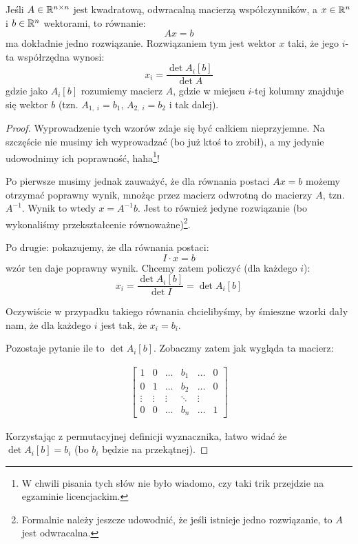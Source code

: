\begin{theorem}
    Jeśli \(A \in \mathbb{R}^{n \times n}\) jest kwadratową, odwracalną macierzą współczynników, a \(x \in \mathbb{R}^n\) i \(b \in \mathbb{R}^n\) wektorami, to równanie:
    \[
        Ax = b
    \]
    ma dokładnie jedno rozwiązanie. Rozwiązaniem tym jest wektor \(x\) taki, że jego \(i\)-ta współrzędna wynosi:
    \[
        x_i = \frac{\det{A_i[b]}}{\det{A}}
    \]
    gdzie jako \(A_i[b]\) rozumiemy macierz \(A\), gdzie w miejscu \(i\)-tej kolumny znajduje się wektor \(b\) (tzn. \(A_{1, \; i} = b_1\), \(A_{2, \; i} = b_2\) i tak dalej).
\end{theorem}
\begin{proof}
Wyprowadzenie tych wzorów zdaje się być całkiem nieprzyjemne. Na szczęście nie musimy ich wyprowadzać (bo już ktoś to zrobił), a my jedynie udowodnimy ich poprawność, haha\footnote{W chwili pisania tych słów nie było wiadomo, czy taki trik przejdzie na egzaminie licencjackim.}!

Po pierwsze musimy jednak zauważyć, że dla równania postaci \(Ax = b\) możemy otrzymać poprawny wynik, mnożąc przez macierz odwrotną do macierzy \(A\), tzn. \(A^{-1}\). Wynik to wtedy \(x = A^{-1}b\). Jest to również jedyne rozwiązanie (bo wykonaliśmy przekształcenie równoważne)\footnote{Formalnie należy jeszcze udowodnić, że jeśli istnieje jedno rozwiązanie, to \(A\) jest odwracalna.}. 

Po drugie: pokazujemy, że dla równania postaci: 
\[ 
    I \cdot x = b
\]
wzór ten daje poprawny wynik. Chcemy zatem policzyć (dla każdego \(i\)):
\[ 
    x_i = \frac{\det{A_i[b]}}{\det{I}} = \det{A_i[b]}
\]

Oczywiście w przypadku takiego równania chcielibyśmy, by śmieszne wzorki dały nam, że dla każdego \(i\) jest tak, że \(x_i = b_i\).

Pozostaje pytanie ile to \( \det{A_i[b]} \). Zobaczmy zatem jak wygląda ta macierz:

\begin{align*}
    \begin{bmatrix}
            1 & 0 & \dots & b_1 & \dots & 0\\
            0 & 1 & \dots & b_2 & \dots & 0 \\ 
            \vdots & \vdots & \vdots & \ddots & \vdots \\ 
            0 & 0 & \dots & b_n  & \dots & 1
        \end{bmatrix}
\end{align*}

Korzystając z permutacyjnej definicji wyznacznika, łatwo widać że \( \det{A_i[b]} = b_i \) (bo \(b_i\) będzie na przekątnej). 


\end{proof}
